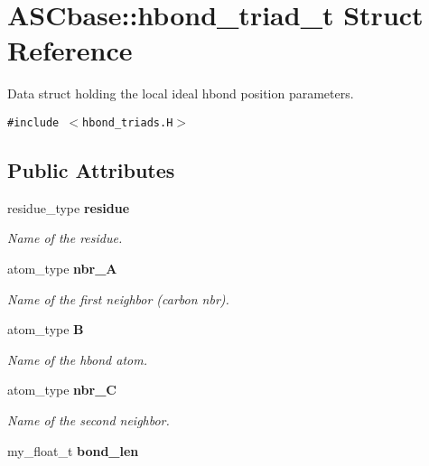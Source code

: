 \section{ASCbase::hbond\_\-triad\_\-t Struct Reference}
\label{structASCbase_1_1hbond__triad__t}
Data struct holding the local ideal hbond position parameters.  


{\tt \#include $<$hbond\_\-triads.H$>$}

\subsection*{Public Attributes}
\begin{CompactItemize}
\item 
residue\_\-type \bf{residue}\label{structASCbase_1_1hbond__triad__t_1798707faec057ecf99c799925405515}

\begin{CompactList}\small\item\em Name of the residue. \item\end{CompactList}\item 
atom\_\-type \bf{nbr\_\-A}\label{structASCbase_1_1hbond__triad__t_c119967e6a52daeb787ee39542b77061}

\begin{CompactList}\small\item\em Name of the first neighbor (carbon nbr). \item\end{CompactList}\item 
atom\_\-type \bf{B}\label{structASCbase_1_1hbond__triad__t_7b75fba196d3ee7c932a6e2ef2f5e731}

\begin{CompactList}\small\item\em Name of the hbond atom. \item\end{CompactList}\item 
atom\_\-type \bf{nbr\_\-C}\label{structASCbase_1_1hbond__triad__t_c130e5b1271da5dde0b3ecceef40ca46}

\begin{CompactList}\small\item\em Name of the second neighbor. \item\end{CompactList}\item 
my\_\-float\_\-t \bf{bond\_\-len}\label{structASCbase_1_1hbond__triad__t_698e8f7f8227cabe2b32be68600d7ae4}


\end{CompactItemize}
